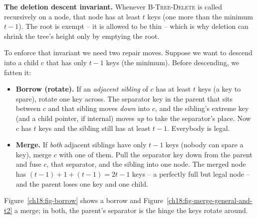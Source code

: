 \begin{focusbox}
\textbf{The deletion descent invariant.} Whenever \textsc{B-Tree-Delete} is called
recursively on a node, that node has at least $t$ keys (one more than the minimum
$t-1$). The root is exempt -- it is allowed to be thin -- which is why deletion can
shrink the tree's height only by emptying the root.
\end{focusbox}

To enforce that invariant we need two repair moves. Suppose we want to descend into
a child $c$ that has only $t-1$ keys (the minimum). Before descending, we fatten it:

\begin{itemize}
\item \textbf{Borrow (rotate).} If an \emph{adjacent sibling} of $c$ has at least
$t$ keys (a key to spare), rotate one key across. The separator key in the parent
that sits between $c$ and that sibling moves \emph{down} into $c$, and the
sibling's extreme key (and a child pointer, if internal) moves \emph{up} to take
the separator's place. Now $c$ has $t$ keys and the sibling still has at least
$t-1$. Everybody is legal.
\item \textbf{Merge.} If \emph{both} adjacent siblings have only $t-1$ keys
(nobody can spare a key), merge $c$ with one of them. Pull the separator key down
from the parent and fuse $c$, that separator, and the sibling into one node. The
merged node has $(t-1) + 1 + (t-1) = 2t-1$ keys -- a perfectly full but legal node
-- and the parent loses one key and one child.
\end{itemize}

Figure~\ref{ch18:fig-borrow} shows a borrow and Figure~\ref{ch18:fig-merge-general-and-t2} a
merge; in both, the parent's separator is the hinge the keys rotate around.


